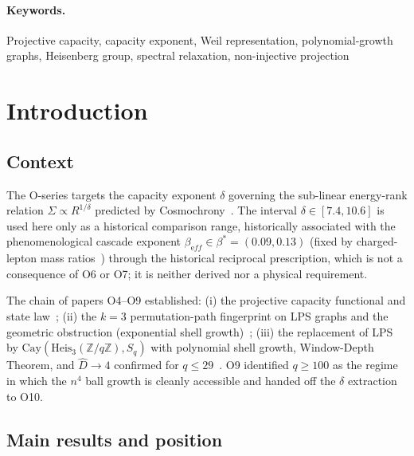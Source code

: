 \documentclass[11pt,a4paper]{article}
\newcommand{\Heis}{\mathrm{Heis}_3(\mathbb{Z}/q\mathbb{Z})}
\newcommand{\Cay}{\mathrm{Cay}}
\newcommand{\Dhat}{\hat{D}}
\newcommand{\bstar}{\beta^{*}}
\begin{document}
  \paragraph{Keywords.}
    Projective capacity, capacity exponent, Weil representation, polynomial-growth graphs, Heisenberg group, spectral
    relaxation, non-injective projection

    \clearpage
    \tableofcontents
    \newpage

    \clearpage

  \section{Introduction}

  \subsection{Context}

    The O-series targets the capacity exponent $\delta$ governing the
    sub-linear energy-rank relation $\Sigma \propto R^{1/\delta}$ predicted
    by Cosmochrony~\cite{Cosmochrony}.
    The interval $\delta \in [7.4, 10.6]$ is used here only as a historical comparison range, historically associated with the
    phenomenological cascade exponent $\beta_{\mathrm eff} \in \bstar = (0.09, 0.13)$
    (fixed by charged-lepton mass ratios~\cite{Beau2026a11}) through the historical reciprocal prescription,
    which is not a consequence of O6 or O7; it is neither derived nor a physical requirement.

    The chain of papers O4--O9 established:
    (i) the projective capacity functional and state law~\cite{Beau2026a8,Beau2026a9,Beau2026a10,Beau2026a11};
    (ii) the $k = 3$ permutation-path fingerprint on LPS graphs and the
    geometric obstruction (exponential shell growth)~\cite{Beau2026a12};
    (iii) the replacement of LPS by $\Cay(\Heis, S_q)$ with polynomial shell growth,
    Window-Depth Theorem, and $\Dhat \to 4$ confirmed for $q \leq 29$~\cite{Beau2026a13}.
    O9 identified $q \geq 100$ as the regime in which the $n^4$ ball growth is
    cleanly accessible and handed off the $\delta$ extraction to O10.

  \subsection{Main results and position}
\end{document}
